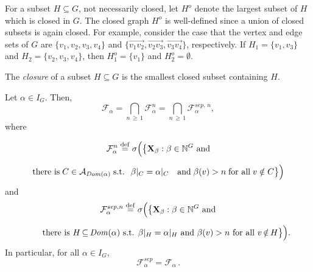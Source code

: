 \documentclass[AHL,Unicode,longabstracts,published]{cedram}
\newcommand{\alf}{\alpha}%
\newcommand*\bb{\beta}
\newcommand*{\defeq}{\stackrel{\mathrm{def}}{=}}
\newcommand*{\sep}{\mathit{sep}}
\newcommand*\dom{\mathit{Dom}}
\newcommand*\N{\mathbb{N}}
\renewcommand{\AA}{\mathcal{A}}
\newcommand*\FF{\mathcal{F}}
\newcommand*\bX{\mathbf{X}}
\newcommand*\N{\mathbb{N}}
\begin{document}
For a subset $H\subseteq G$, not necessarily closed, let $H^o$ denote the largest subset of $H$ which is closed in $G$. The closed graph $H^o$ is well-defined since a union of closed subsets is again closed. For example, consider the case that the vertex and edge sets of $G$ are $\{v_1,v_2,v_3,v_4\}$ and $\{\overrightarrow{v_1v_2}, \overrightarrow{v_2v_3}, \overrightarrow{v_3v_4}\}$, respectively. If $H_1=\{v_1,v_3\}$ and $H_2=\{v_2,v_3,v_4\}$, then $H_1^o=\{v_1\}$ and $H_2^o=\emptyset$.

The \emph{closure} of a subset $H \subseteq G$ is the smallest closed subset containing $H$.

\begin{lemm}\label{lem: symmetric variables with respect to X}
Let $\alf \in I_G$. Then,
\[
\FF_\alf = \bigcap_{n\,\geq\,1} \FF_\alf^n = \bigcap_{n\, \geq\,1} \mathcal{F}_\alf^{\sep,\,n},
\]
where

\begin{multline*}
\FF_\alf^n
\defeq\sigma\Big(\big\{
\bX_\bb: \bb \in \N^G \text{ \rm and}
\\[0.5em]
\text{there is}\;C \;{\in}\; \AA_{\dom(\alf)}\;\text{\rm s.t. }\;\bb|_C=\alf|_C\quad\text{\rm and}\;\bb(v)>n\;\text{\rm for all}\;v\;{\notin}\; C\big\}\Big)
\end{multline*}
and
\begin{multline*}
\mathcal{F}^{\sep,n}_\alf
\defeq\sigma\Big(\big\{
\bX_\bb: \bb \in \N^G \text{ \rm and}
\\[0.5em]
\qquad
\text{there is } H \,{\subseteq}\, \dom(\alf) \text{ \rm s.t. } \bb|_H=\alf|_H \text{ \rm and } \bb(v)>n \text{ \rm for all } v \,{\notin}\, H\big\}\Big).
\end{multline*}
In particular, for all $\alf\in I_G$,
\[
\FF_\alf ^{\sep}=\FF_\alf\,.
\]
\end{lemm}
\end{document}
